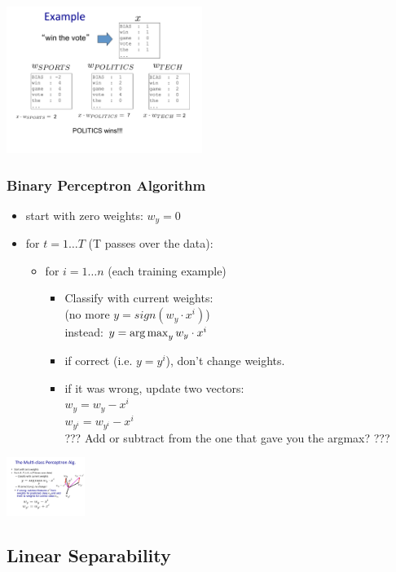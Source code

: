 \includegraphics[width=2.5in]{figures/perceptron_multiclass--win_the_vote.pdf}

 \subsubsection{Binary Perceptron Algorithm}
 \begin{itemize}
 	\item start with zero weights: $w_y=0$
	\item for $ t = 1 \dots T$ (T passes over the data):
		\begin{itemize}
			\item for $i = 1 \dots n$ (each training example)
			\begin{itemize}
				\item  Classify with current weights: \hfill \\
					(no more $ y = sign(w_y \cdot x^i)$) \hfill \\
					instead:  $y= \operatorname*{arg\,max}_y w_y \cdot x^i$ \hfill \\
				\item if correct (i.e. $y = y^i$), don't change weights.
				\item if it was wrong, update two vectors: \hfill \\
					$w_y = w_y -x^i$ \hfill \\
					$w_{y^i} = w_{y^i} -x^i$ \hfill \\
					??? Add or subtract from the one that gave you the argmax? ???
			\end{itemize}
		\end{itemize}
 \end{itemize}
 \includegraphics[width=1.0in]{figures/multi_perceptron_rule.pdf}
 
 \subsection{Linear Separability}
